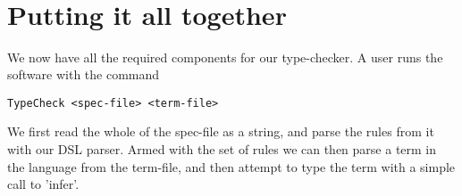 {\begin{code}
\AgdaSpace{}%
\AgdaSymbol{\#-\}}\<%
\\
%
\>[2]\AgdaSpace{}%
\AgdaSpace{}%
\AgdaSymbol{=}\AgdaSpace{}%
%
\>[793I]\AgdaSymbol{(}\AgdaSpace{}%
\AgdaSymbol{(}\AgdaSpace{}%
\AgdaSymbol{)}\AgdaSpace{}%
\<%
\\
\>[793I][@{}l@{\AgdaIndent{0}}]%
\>[37]\AgdaSpace{}%
\AgdaSymbol{(}\AgdaSpace{}%
\AgdaSymbol{)}\AgdaSpace{}%
\<%
\\
%
\>[37]\AgdaSpace{}%
\AgdaSpace{}%
\<%
\\
%
\>[37]\AgdaInductiveConstructor{[]}\AgdaSymbol{)}\<%
\end{code}
}
\section{Putting it all together}
We now have all the required components for our type-checker. A user runs the software
with the command \begin{verbatim}TypeCheck <spec-file> <term-file>\end{verbatim}We
first read the whole of the spec-file as a string, and parse the rules from it with
our DSL parser. Armed with the set of rules we can then parse a term in the language
from the term-file, and then attempt to type the term with a simple call to 'infer'.

